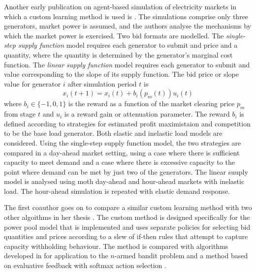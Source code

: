Another early publication on agent-based simulation of electricity markets in
which a custom learning method is used is \cite{visud:99}.  The simulations
comprise only three generators, market power is assumed, and the authors
analyse the mechanisms by which the market power is exercised.  Two bid formats
are modelled.  The \textit{single-step supply function} model requires each
generator to submit and price and a quantity, where the quantity is determined
by the generator's marginal cost function.  The \textit{linear supply
function} model requires each generator to submit and value corresponding to
the slope of its supply function.  The bid price or slope value for generator
$i$ after simulation period $t$ is
\begin{equation}
x_i(t+1) = x_i(t) + b_i(p_m(t))u_i(t)
\end{equation}
where $b_i \in \lbrace-1,0,1\rbrace$ is the reward as a function of the market
clearing price $p_m$ from stage $t$ and $u_i$ is a reward gain or attenuation
parameter.  The reward $b_i$ is defined according to strategies for estimated
profit maximistaion and competition to be the base load generator.  Both
elastic and inelastic load models are considered.  Using the single-step supply
function model, the two strategies are compared in a day-ahead market setting,
using a case where there is sufficient capacity to meet demand and a case where
there is excessive capacity to the point where demand can be met by just two of
the generators.  The linear suuply model is analysed using moth day-ahead and
hour-ahead markets with inelastic load.  The hour-ahead simulation is repeated
with elastic demand response.

The first coauthor goes on to compare a similar custom learning method with two
other algoithms in her thesis \cite{visud:thesis}.  The custom method is
designed specifically for the power pool model that is implemented and uses
separate policies for selecting bid quantities and prices according to a slew of if-then
rules that attempt to capture capacity withholding behaviour.  The method is
compared with algorithms developed in \cite{auer:03} for application to the
$n$-armed bandit problem \cite[\S2.1]{robbins:53,suttonbarto:1998} and a method
based on evaluative feedback with softmax action selection
\cite[\S2]{suttonbarto:1998}.

